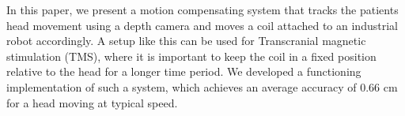 In this paper, we present a motion compensating system that tracks the patients head movement using a depth camera and moves a coil attached to an industrial robot accordingly. A setup like this can be used for Transcranial magnetic stimulation (TMS), where it is important to keep the coil in a fixed position relative to the head for a longer time period. We developed a functioning implementation of such a system, which achieves an average accuracy of 0.66 cm for a head moving at typical speed.

